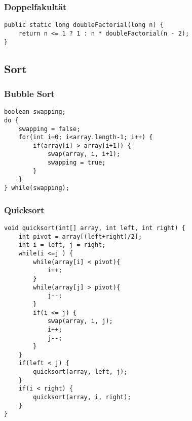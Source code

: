 \begin{multicols*}{5}
	\subsubsection{Doppelfakultät}
	\begin{lstlisting}
public static long doubleFactorial(long n) {
	return n <= 1 ? 1 : n * doubleFactorial(n - 2);
}
	\end{lstlisting}


	\subsection{Sort}
	\subsubsection{Bubble Sort}
	\begin{lstlisting}
boolean swapping;
do {
	swapping = false;
	for(int i=0; i<array.length-1; i++) {
		if(array[i] > array[i+1]) {
			swap(array, i, i+1);
			swapping = true; 
		} 
	}
} while(swapping);
	\end{lstlisting}

	\subsubsection{Quicksort}
		\begin{lstlisting}
void quicksort(int[] array, int left, int right) {
	int pivot = array[(left+right)/2];
	int i = left, j = right;
	while(i <=j ) {
		while(array[i] < pivot){
			i++; 
		}
		while(array[j] > pivot){
			j--; 
		}
		if(i <= j) {
			swap(array, i, j); 
			i++; 
			j--; 
		} 
	}
	if(left < j) {
		quicksort(array, left, j); 
	}
	if(i < right) { 
		quicksort(array, i, right); 
	} 
}
		\end{lstlisting}





	


\end{multicols*}

% 


